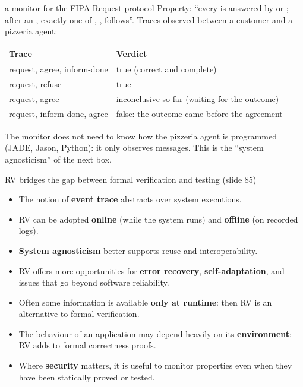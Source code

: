 \begin{nbexample}{a monitor for the FIPA Request protocol}
\notinslides
Property: ``every  is answered by  or ; after an
, exactly one of , , 
follows''. Traces observed between a customer and a pizzeria agent:
\begin{center}
\small
\begin{tabular}{@{}ll@{}}
\toprule
\textbf{Trace} & \textbf{Verdict} \\
\midrule
request, agree, inform-done & \textcolor{nbgreen!60!black}{true} (correct and complete) \\
request, refuse & \textcolor{nbgreen!60!black}{true} \\
request, agree & \textcolor{nborange}{inconclusive} so far (waiting for the outcome) \\
request, inform-done, agree & \textcolor{nbred}{false}: the outcome came before the agreement \\
\bottomrule
\end{tabular}
\end{center}
The monitor does not need to know how the pizzeria agent is programmed (JADE, Jason,
Python): it only observes messages. This is the ``system agnosticism'' of the next box.
\end{nbexample}

\begin{nbfact}{RV bridges the gap between formal verification and testing (slide 85)}
\begin{itemize}[nosep]
  \item The notion of \textbf{event trace} abstracts over system executions.
  \item RV can be adopted \textbf{online} (while the system runs) and \textbf{offline}
        (on recorded logs).
  \item \textbf{System agnosticism} better supports reuse and interoperability.
  \item RV offers more opportunities for \textbf{error recovery}, \textbf{self-adaptation},
        and issues that go beyond software reliability.
  \item Often some information is available \textbf{only at runtime}: then RV is an
        alternative to formal verification.
  \item The behaviour of an application may depend heavily on its \textbf{environment}: RV
        adds to formal correctness proofs.
  \item Where \textbf{security} matters, it is useful to monitor properties even when they
        have been statically proved or tested.
\end{itemize}
\end{nbfact}

